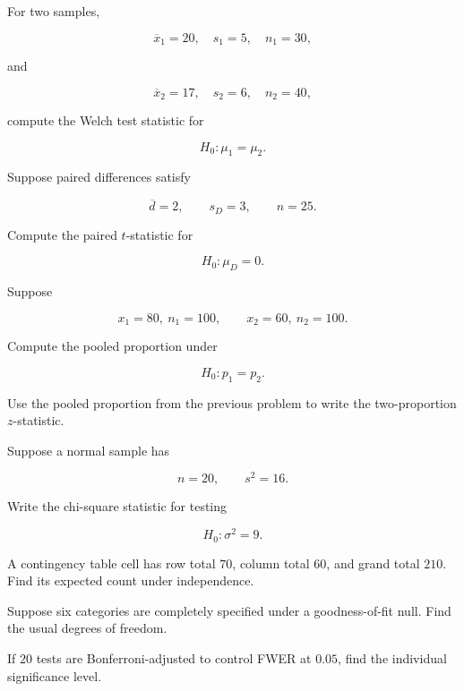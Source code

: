 \begin{exercise}[2]
For two samples,

\[
\overline{x}_1=20,\quad s_1=5,\quad n_1=30,
\]

and

\[
\overline{x}_2=17,\quad s_2=6,\quad n_2=40,
\]

compute the Welch test statistic for

\[
H_0:\mu_1=\mu_2.
\]
\end{exercise}

\begin{exercise}[2]
Suppose paired differences satisfy

\[
\overline{d}=2,
\qquad
s_D=3,
\qquad
n=25.
\]

Compute the paired \(t\)-statistic for

\[
H_0:\mu_D=0.
\]
\end{exercise}

\begin{exercise}[2]
Suppose

\[
x_1=80,\ n_1=100,
\qquad
x_2=60,\ n_2=100.
\]

Compute the pooled proportion under

\[
H_0:p_1=p_2.
\]
\end{exercise}

\begin{exercise}[2]
Use the pooled proportion from the previous problem to write the
two-proportion \(z\)-statistic.
\end{exercise}

\begin{exercise}[2]
Suppose a normal sample has

\[
n=20,
\qquad
s^2=16.
\]

Write the chi-square statistic for testing

\[
H_0:\sigma^2=9.
\]
\end{exercise}

\begin{exercise}[2]
A contingency table cell has row total \(70\), column total \(60\), and
grand total \(210\). Find its expected count under independence.
\end{exercise}

\begin{exercise}[2]
Suppose six categories are completely specified under a
goodness-of-fit null. Find the usual degrees of freedom.
\end{exercise}

\begin{exercise}[2]
If \(20\) tests are Bonferroni-adjusted to control FWER at \(0.05\),
find the individual significance level.
\end{exercise}


